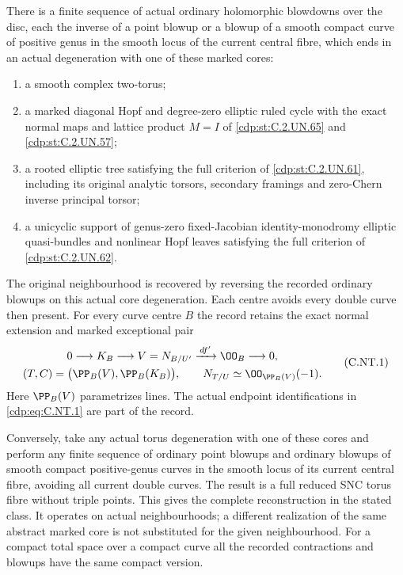 \begin{proposition}
There is a finite sequence of actual ordinary holomorphic
blowdowns over the disc, each the inverse of a point blowup
or a blowup of a smooth compact curve of positive genus in
the smooth locus of the current central fibre, which ends
in an actual degeneration with one of these marked cores:
\begin{enumerate}
\item a smooth complex two-torus;
\item a marked diagonal Hopf and degree-zero elliptic ruled
cycle with the exact normal maps and lattice product $M=I$
of \ref{cdp:st:C.2.UN.65} and \ref{cdp:st:C.2.UN.57};
\item a rooted elliptic tree satisfying the full criterion
of \ref{cdp:st:C.2.UN.61}, including its original analytic torsors,
secondary framings and zero-Chern inverse principal torsor;
\item a unicyclic support of genus-zero fixed-Jacobian
identity-monodromy elliptic quasi-bundles and nonlinear
Hopf leaves satisfying the full criterion of \ref{cdp:st:C.2.UN.62}.
\end{enumerate}
The original neighbourhood is recovered by reversing the
recorded ordinary blowups on this actual core degeneration.
Each centre avoids every double curve then present.
For every curve centre $B$ the record retains the exact
normal extension and marked exceptional pair
\[
 \begin{gathered}
 0\longrightarrow K_B\longrightarrow V=N_{B/U'}
                 \xrightarrow{\,df'\,}\OO_B\longrightarrow0,\\
 (T,C)=\bigl(\PP_B(V),\PP_B(K_B)\bigr),\qquad
 N_{T/U}\simeq\OO_{\PP_B(V)}(-1).
 \end{gathered}
\tag{C.NT.1}\label{cdp:eq:C.NT.1}
\]
Here $\PP_B(V)$ parametrizes lines. The actual endpoint
identifications in \eqref{cdp:eq:C.NT.1} are part of the record.

Conversely, take any actual torus degeneration with one of
these cores and perform any finite sequence of ordinary
point blowups and ordinary blowups of smooth compact
positive-genus curves in the smooth locus of its current
central fibre, avoiding all current double curves. The
result is a full reduced SNC torus fibre without triple
points. This gives the complete reconstruction in the
stated class. It operates on actual neighbourhoods; a
different realization of the same abstract marked core
is not substituted for the given neighbourhood.
For a compact total space over a compact curve all the
recorded contractions and blowups have the same compact
version.


\end{proposition}
